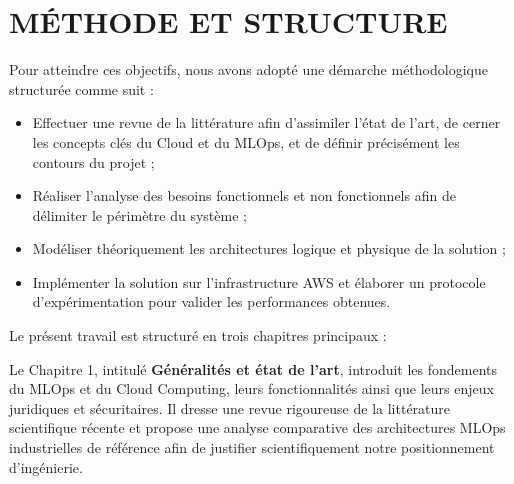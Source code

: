 

\section*{MÉTHODE ET STRUCTURE}
Pour atteindre ces objectifs, nous avons adopté une démarche méthodologique structurée comme suit :
\begin{itemize}
    \item[$\bullet$] Effectuer une revue de la littérature afin d'assimiler l'état de l'art, de cerner les concepts clés du Cloud et du MLOps, et de définir précisément les contours du projet ;
    \item[$\bullet$] Réaliser l'analyse des besoins fonctionnels et non fonctionnels afin de délimiter le périmètre du système ;
    \item[$\bullet$] Modéliser théoriquement les architectures logique et physique de la solution ;
    \item[$\bullet$] Implémenter la solution sur l'infrastructure AWS et élaborer un protocole d'expérimentation pour valider les performances obtenues.
\end{itemize}

\vspace{1.5mm}
Le présent travail est structuré en trois chapitres principaux :

Le Chapitre 1, intitulé \textbf{Généralités et état de l'art}, introduit les fondements du MLOps et du Cloud Computing, leurs fonctionnalités ainsi que leurs enjeux juridiques et sécuritaires. Il dresse une revue rigoureuse de la littérature scientifique récente et propose une analyse comparative des architectures MLOps industrielles de référence afin de justifier scientifiquement notre positionnement d'ingénierie.

